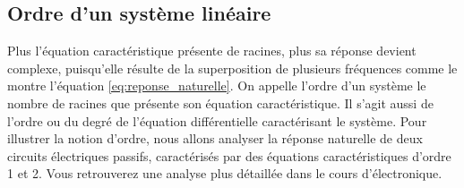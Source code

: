 	
	
	\subsection{Ordre d'un système linéaire}
	Plus l'équation caractéristique présente de racines, plus sa
        réponse devient complexe, puisqu'elle résulte de la
        superposition de plusieurs fréquences comme le montre
        l'équation \ref{eq:reponse_naturelle}. On appelle l'ordre d'un
        système le nombre de racines que présente son équation
        caractéristique. Il s'agit aussi de l'ordre ou du degré de
        l'équation différentielle caractérisant le système. Pour
        illustrer la notion d'ordre, nous allons analyser la réponse
        naturelle de deux circuits électriques passifs, caractérisés
        par des équations caractéristiques d'ordre 1 et 2. Vous
        retrouverez une analyse plus détaillée dans le cours
        d'électronique.
	
